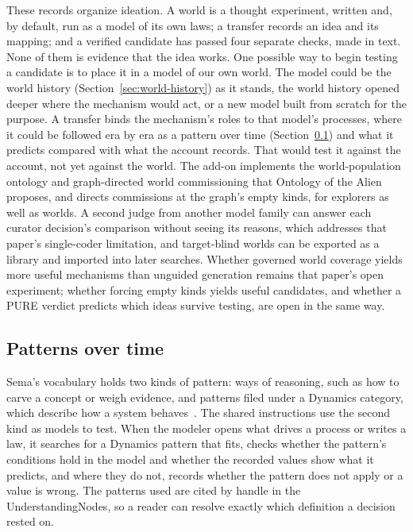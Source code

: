 \documentclass[11pt,a4paper]{article}
\begin{document}
These records organize ideation. A world is a thought experiment, written and,
by default, run as a model of its own laws; a transfer records an idea
and its mapping; and a verified candidate has passed four separate checks, made
in text. None of them is evidence that
the idea works. One possible way to begin testing a candidate is to place it in a
model of our own world. The model could be the world history
(Section~\ref{sec:world-history}) as it stands, the world history opened deeper
where the mechanism would act, or a new model built from scratch for the
purpose. A transfer binds the mechanism's roles to that model's processes, where
it could be followed era by era as a pattern over time
(Section~\ref{sec:patterns-over-time}) and what it predicts compared with what
the account records. That would test it against the account, not yet against
the world. The add-on implements the world-population ontology and
graph-directed world commissioning that Ontology of the Alien proposes, and directs
commissions at the graph's empty kinds, for explorers as well as worlds. A second
judge from another model family can answer each curator decision's comparison
without seeing its reasons, which addresses that paper's single-coder limitation,
and target-blind worlds can be exported as a library and imported into later
searches. Whether governed world coverage yields more useful mechanisms than
unguided generation remains that paper's open experiment; whether forcing empty
kinds yields useful candidates, and whether a PURE verdict predicts which ideas
survive testing, are open in the same way.

\subsection{Patterns over time}
\label{sec:patterns-over-time}

Sema's vocabulary holds two kinds of pattern: ways of reasoning, such as how to
carve a concept or weigh evidence, and patterns filed under a Dynamics category,
which describe how a system behaves~\cite{westerbergSema2026}. The shared
instructions use the second kind as models to test. When the modeler opens what
drives a process or writes a law, it searches for a Dynamics pattern that fits,
checks whether the pattern's conditions hold in the model and whether the
recorded values show what it predicts, and where they do not, records whether
the pattern does not apply or a value is wrong. The patterns used are cited by
handle in the UnderstandingNodes, so a reader can resolve exactly which
definition a decision rested on.
\end{document}
